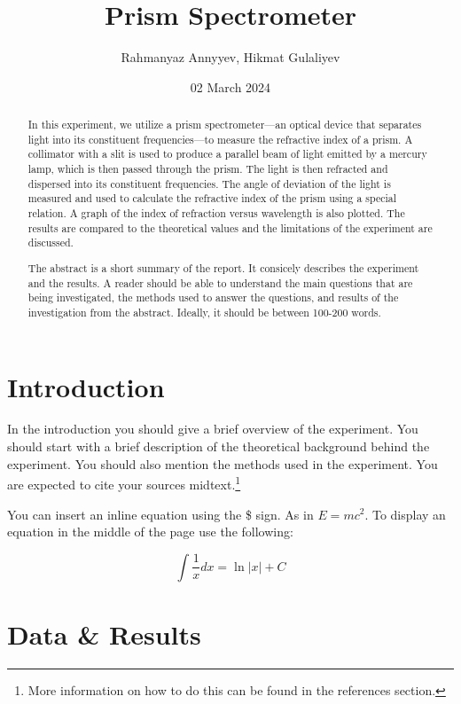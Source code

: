 \documentclass[10pt]{article}
\title{Prism Spectrometer} %
\author{Rahmanyaz Annyyev, Hikmat Gulaliyev} %
\date{02 March 2024} %
\begin{document}
\maketitle

\begin{abstract}
In this experiment, we utilize a prism spectrometer---an optical device that separates light into its constituent frequencies---to measure the refractive index of a prism. A collimator with a slit is used to produce a parallel beam of light emitted by a mercury lamp, which is then passed through the prism. The light is then refracted and dispersed into its constituent frequencies. The angle of deviation of the light is measured and used to calculate the refractive index of the prism using a special relation. A graph of the index of refraction versus wavelength is also plotted. The results are compared to the theoretical values and the limitations of the experiment are discussed.


The abstract is a short summary of the report. It consicely describes the experiment and the results. A reader should be able to understand the main questions that are being investigated, the methods used to answer the questions, and results of the investigation from the abstract. Ideally, it should be between 100-200 words.

\end{abstract}

\section{Introduction}

In the introduction you should give a brief overview of the experiment. You should start with a brief description of the theoretical background behind the experiment. You should also mention the methods used in the experiment. You are expected to cite your sources\cite{Bravyi_2020} midtext.\footnote{More information on how to do this can be found in the references section.}


You can insert an inline equation using the \$ sign. As in $E=mc^2$. To display an equation in the middle of the page use the following:

\begin{equation}
    \int \frac{1}{x} dx = \ln|x| + C
\end{equation}

\section{Data \& Results}
\end{document}
